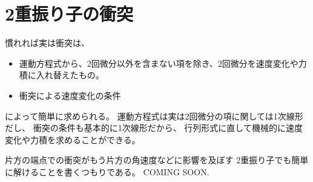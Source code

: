 \documentclass[a4paper,11pt]{jsarticle}
\begin{document}
\section{2重振り子の衝突}

慣れれば実は衝突は、
\begin{itemize}
  \item 運動方程式から、2回微分以外を含まない項を除き、2回微分を速度変化や力積に入れ替えたもの。
  \item 衝突による速度変化の条件
\end{itemize}
によって簡単に求められる。
運動方程式は実は2回微分の項に関しては1次線形だし、
衝突の条件も基本的に1次線形だから、
行列形式に直して機械的に速度変化や力積を求めることができる。

片方の端点での衝突がもう片方の角速度などに影響を及ぼす
2重振り子でも簡単に解けることを書くつもりである。
COMING SOON.
\end{document}
